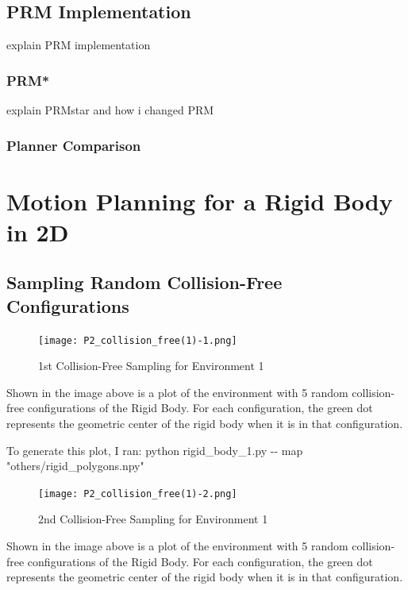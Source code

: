 \documentclass{article}
\begin{document}
\subsection{PRM Implementation}
explain PRM implementation
\subsubsection{PRM*}
explain PRMstar and how i changed PRM
\subsubsection{Planner Comparison}
\maketitle
\section{Motion Planning for a Rigid Body in 2D}
\subsection{Sampling Random Collision-Free Configurations}
\begin{figure}[h!]
	\texttt{[image: P2\_collision\_free(1)-1.png]}
	\centering
	\caption{1st Collision-Free Sampling for Environment 1}
	\label{P2_collision_free(1)-1.png}
\end{figure}

Shown in the image above is a plot of the environment with 5 random collision-free configurations of the Rigid Body. For each configuration, the green dot represents the geometric center of the rigid body when it is in that configuration. \newline 

To generate this plot, I ran: \newline 
python rigid\_body\_1.py -\-- map "others/rigid\_polygons.npy"


\newpage 
\begin{figure}[h!]
	\texttt{[image: P2\_collision\_free(1)-2.png]}
	\centering
	\caption{2nd Collision-Free Sampling for Environment 1}
	\label{P2_collision_free(1)-2.png}
\end{figure}
Shown in the image above is a plot of the environment with 5 random collision-free configurations of the Rigid Body. For each configuration, the green dot represents the geometric center of the rigid body when it is in that configuration. \newline 
\end{document}
